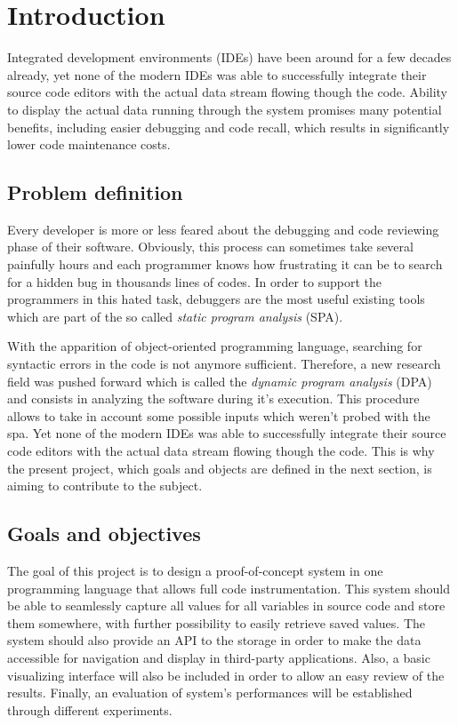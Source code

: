 
\chapter{Introduction} %
\label{chap:introduction}

Integrated development environments (IDEs) have been around for a few decades already, yet none of the modern IDEs was able to successfully integrate their source code editors with the actual data stream flowing though the code. Ability to display the actual data running through the system promises many potential benefits, including easier debugging and code recall, which results in significantly lower code maintenance costs. 

\section{Problem definition}
Every developer is more or less feared about the debugging and code reviewing phase of their software. Obviously, this process can sometimes take several painfully hours and each programmer knows how frustrating it can be to search for a hidden bug in thousands lines of codes. In order to support the programmers in this hated task, debuggers are the most useful existing tools which are part of the so called \textit{static program analysis} (SPA). 

With the apparition of object-oriented programming language, searching for syntactic errors in the code is not anymore sufficient. Therefore, a new research field was pushed forward which is called the \textit{dynamic program analysis} (DPA) and consists in analyzing the software during it's execution. This procedure allows to take in account some possible inputs which weren't probed with the \gls{spa}. Yet none of the modern IDEs was able to successfully integrate their source code editors with the actual data stream flowing though the code. This is why the present project, which goals and objects are defined in the next section, is aiming to contribute to the subject.

\section{Goals and objectives}
The goal of this project is to design a proof-of-concept system in one programming language that allows full code instrumentation. This system should be able to seamlessly capture all values for all variables in source code and store them somewhere, with further possibility to easily retrieve saved values. The system should also provide an API to the storage in order to make the data accessible for navigation and display in third-party applications. Also, a basic visualizing interface will also be included in order to allow an easy review of the results. Finally, an evaluation of system's performances will be established through different experiments.

